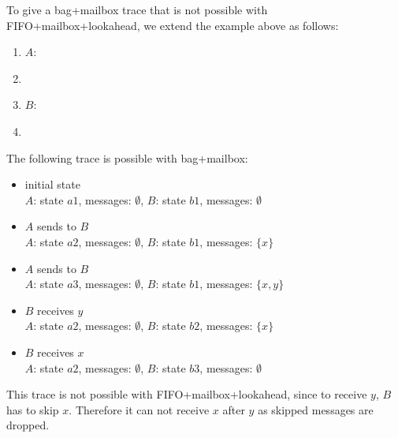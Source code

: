 To give a bag+mailbox trace that is not possible with FIFO+mailbox+lookahead, we extend the example above as follows:
\begin{enumerate}[]
\item $A$:
\item
{}
\item $B$:
\item
{}
\end{enumerate}
The following trace is possible with bag+mailbox:
\begin{itemize}
\item initial state\\
	$A$: state $a1$, messages: $\emptyset$, $B$: state $b1$, messages: $\emptyset$
\item $A$ sends to $B$\\
	$A$: state $a2$, messages: $\emptyset$, $B$: state $b1$, messages: $\{x\}$
\item $A$ sends to $B$\\
	$A$: state $a3$, messages: $\emptyset$, $B$: state $b1$, messages: $\{x, y\}$
\item $B$ receives $y$\\
	$A$: state $a2$, messages: $\emptyset$, $B$: state $b2$, messages: $\{x\}$
\item $B$ receives $x$\\
	$A$: state $a2$, messages: $\emptyset$, $B$: state $b3$, messages: $\emptyset$
\end{itemize}
This trace is not possible with FIFO+mailbox+lookahead, since to receive $y$, $B$ has to skip $x$. Therefore it can not receive $x$ after $y$ as skipped messages are dropped.